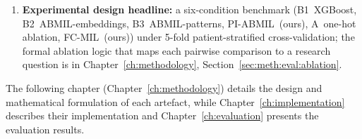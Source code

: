 \begin{enumerate}
    \item \textbf{Experimental design headline:} a six-condition
    benchmark (B1~XGBoost, B2~ABMIL-embeddings, B3~ABMIL-patterns,
    PI-ABMIL~(ours), A~one-hot ablation, FC-MIL~(ours)) under 5-fold
    patient-stratified cross-validation; the formal ablation logic
    that maps each pairwise comparison to a research question is in
    Chapter~\ref{ch:methodology}, Section~\ref{sec:meth:eval:ablation}.
\end{enumerate}

The following chapter (Chapter~\ref{ch:methodology}) details the design
and mathematical formulation of each artefact, while
Chapter~\ref{ch:implementation} describes their implementation and
Chapter~\ref{ch:evaluation} presents the evaluation results.
